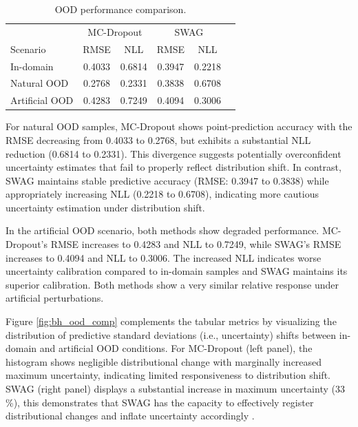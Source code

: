 \begin{table}[h!]
\centering
\begin{tabular}{lccccc}
\toprule
 & \multicolumn{2}{c}{MC-Dropout} & \multicolumn{2}{c}{SWAG} \\
Scenario & RMSE & NLL & RMSE & NLL \\
\midrule
In-domain & 0.4033 & 0.6814 & 0.3947 & 0.2218 \\
Natural OOD & 0.2768 & 0.2331 & 0.3838 & 0.6708 \\
Artificial OOD & 0.4283 & 0.7249 & 0.4094 & 0.3006 \\
\bottomrule
\end{tabular}
\caption{OOD performance comparison.}
\label{tab:ood_results}
\end{table}

For natural OOD samples, MC-Dropout shows point-prediction accuracy with the RMSE decreasing from 0.4033 to
0.2768, but exhibits a substantial NLL reduction (0.6814 to 0.2331). This divergence suggests potentially
overconfident uncertainty estimates that fail to properly reflect distribution shift. In contrast, SWAG
maintains stable predictive accuracy (RMSE: 0.3947 to 0.3838) while appropriately increasing NLL (0.2218
to 0.6708), indicating more cautious uncertainty estimation under distribution shift.

In the artificial OOD scenario, both methods show degraded performance. MC-Dropout's RMSE increases to
0.4283 and NLL to 0.7249, while SWAG's RMSE increases to 0.4094 and NLL to 0.3006. The increased NLL
indicates worse uncertainty calibration compared to in-domain samples and SWAG maintains its superior
calibration. Both methods show a very similar relative response under artificial perturbations.

Figure \ref{fig:bh_ood_comp} complements the tabular metrics by visualizing the distribution of predictive
standard deviations (i.e., uncertainty) shifts between in-domain and artificial OOD conditions. For MC-Dropout (left panel), the histogram shows negligible distributional change with marginally
increased maximum uncertainty, indicating limited responsiveness to distribution shift. SWAG (right panel)
displays a substantial increase in maximum uncertainty (33\,\%), this demonstrates that SWAG has the
capacity to effectively register distributional changes and inflate uncertainty accordingly
\citep{maddox2019swag}.

\FloatBarrier

